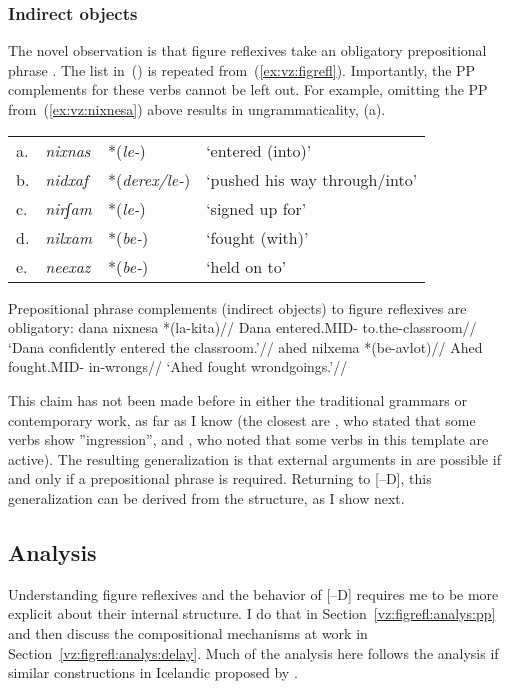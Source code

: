 	\subsubsection{Indirect objects}
The novel observation is that figure reflexives take an obligatory prepositional phrase \citep{kastner16phd,ahdoutkastner18}. The list in~(\nextx) is repeated from~(\ref{ex:vz:figrefl}). Importantly, the PP complements for these verbs cannot be left out. For example, omitting the PP from~(\ref{ex:vz:nixnesa}) above results in ungrammaticality, (\anextx a).
\ex \begin{tabular}{l>{\em}lll}
	a.& nixnas &  *(\emph{le-}) & `entered (into)'\\
	b.& nidxaf & *(\emph{derex/le-})  & `pushed his way through/into' \\
	c.& nirʃam & *(\emph{le-})  & `signed up for' \\
	d.& nilxam & *(\emph{be-}) & `fought (with)' \\
	e.& neexaz & *(\emph{be-}) & `held on to' \\
    \end{tabular}
\xe

\pex Prepositional phrase complements (indirect objects) to figure reflexives are obligatory:
	\a \begingl
		\gla dana nixnesa *(la-kita)//
		\glb Dana entered.MID- to.the-classroom//
		\glft `Dana confidently entered the classroom.'//
	\endgl
	\a \begingl
		\gla ahed nilxema *(be-avlot)//
		\glb Ahed fought.MID- in-wrongs//
		\glft `Ahed fought wrondgoings.'//
	\endgl
\xe

This claim has not been made before in either the traditional grammars or contemporary work, as far as I know (the closest are \citealt[87]{berman78}, who stated that some verbs show ''ingression'', and \citealt{schwarzwald08}, who noted that some verbs in this template are active). The resulting generalization is that external arguments in {\tnif} are possible if and only if a prepositional phrase is required. Returning to [--D], this generalization can be derived from the structure, as I show next.

	\subsection{Analysis} \label{vz:figrefl:analys}
Understanding figure reflexives and the behavior of [--D] requires me to be more explicit about their internal structure. I do that in Section~\ref{vz:figrefl:analys:pp} and then discuss the compositional mechanisms at work in Section~\ref{vz:figrefl:analys:delay}. Much of the analysis here follows the analysis if similar constructions in Icelandic proposed by \cite{wood15springer}.

